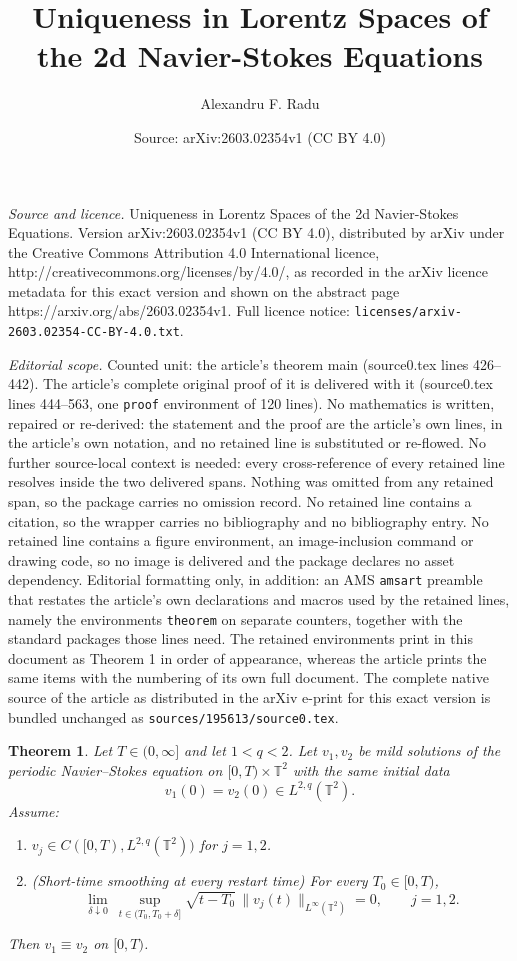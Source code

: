 \documentclass[10pt,a4paper]{amsart}
\title{Uniqueness in Lorentz Spaces of the 2d Navier-Stokes Equations}
\author{Alexandru F. Radu}
\date{Source: arXiv:2603.02354v1 (CC BY 4.0)}
\newtheorem{theorem}{Theorem}
\begin{document}
\maketitle

\noindent\emph{Source and licence.} Uniqueness in Lorentz Spaces of the 2d Navier-Stokes Equations. Version arXiv:2603.02354v1 (CC BY 4.0), distributed by arXiv under the Creative Commons Attribution 4.0 International licence, http://creativecommons.org/licenses/by/4.0/, as recorded in the arXiv licence metadata for this exact version and shown on the abstract page https://arxiv.org/abs/2603.02354v1. Full licence notice: \texttt{licenses/arxiv-2603.02354-CC-BY-4.0.txt}.\par\smallskip

\noindent\textit{Editorial scope.} Counted unit: the article's theorem main (source0.tex lines 426--442). The article's complete original proof of it is delivered with it (source0.tex lines 444--563, one \texttt{proof} environment of 120 lines). No mathematics is written, repaired or re-derived: the statement and the proof are the article's own lines, in the article's own notation, and no retained line is substituted or re-flowed.  No further source-local context is needed: every cross-reference of every retained line resolves inside the two delivered spans.  Nothing was omitted from any retained span, so the package carries no omission record.  No retained line contains a citation, so the wrapper carries no bibliography and no bibliography entry.  No retained line contains a figure environment, an image-inclusion command or drawing code, so no image is delivered and the package declares no asset dependency.  Editorial formatting only, in addition: an AMS \texttt{amsart} preamble that restates the article's own declarations and macros used by the retained lines, namely the environments \texttt{theorem} on separate counters, together with the standard packages those lines need.  The retained environments print in this document as Theorem 1 in order of appearance, whereas the article prints the same items with the numbering of its own full document.  The complete native source of the article as distributed in the arXiv e-print for this exact version is bundled unchanged as \texttt{sources/195613/source0.tex}.
\begin{theorem}\label{main}
Let $T\in(0,\infty]$ and let $1<q<2$. Let $v_1,v_2$ be mild solutions of the periodic Navier--Stokes equation on
$[0,T)\times\mathbb T^2$ with the same initial data
\[
v_1(0)=v_2(0)\in L^{2,q}(\mathbb T^2).
\]
Assume:
\begin{enumerate}
\item $v_j\in C([0,T),L^{2,q}(\mathbb T^2))$ for $j=1,2$.
\item (Short-time smoothing at every restart time) For every $T_0\in[0,T)$,
\begin{equation}\label{eq:S}
\lim_{\delta\downarrow 0}\ \sup_{t\in(T_0,T_0+\delta]}
\sqrt{t-T_0}\,\|v_j(t)\|_{L^\infty(\mathbb T^2)}=0,\qquad j=1,2.
\end{equation}
\end{enumerate}
Then $v_1\equiv v_2$ on $[0,T)$.
\end{theorem}
\end{document}
